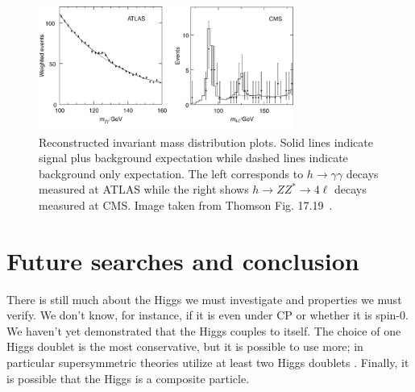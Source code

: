 \begin{figure}
  \centering
  \includegraphics[width=0.75\textwidth,height=0.75\textheight,keepaspectratio]
                {pictures/higgs_results.png}
  \caption{Reconstructed invariant mass distribution plots. Solid lines
           indicate signal plus background expectation while dashed lines
           indicate background only expectation. The left corresponds to 
           $h\to\gamma\gamma$ decays measured at ATLAS while the right shows
           $h\to ZZ^{*}\to4\ell$ decays measured at CMS. Image taken from 
           Thomson Fig. 17.19~\cite{thomson_modern_2013}.}
  \label{fig:higgsevidence}
\end{figure}

\section{Future searches and conclusion}
There is still much about the
Higgs we must investigate and properties we must verify. We don't know, for
instance, if it is even under CP or whether it is spin-0. We 
haven't yet demonstrated that the Higgs couples to itself. The choice of one 
Higgs doublet is the most conservative, but it is possible to use more; in 
particular supersymmetric theories utilize at least two Higgs doublets 
\cite{thomson_modern_2013}. Finally, it is possible that the 
Higgs is a composite particle. 



                               

